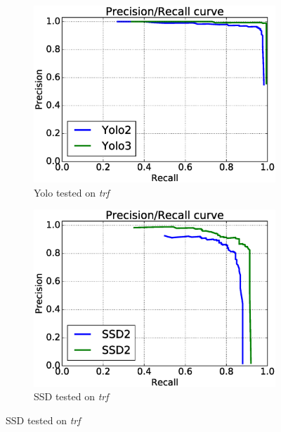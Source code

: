 \begin{figure}[h!]
\begin{subfigure}{.5\textwidth}
  \centering
  \includegraphics[width=0.8\linewidth]{results/case_buildings/prec_recall/yolo/trf.eps}
  \caption{Yolo tested on \textit{trf}}
  \label{fig:sfig1}
\end{subfigure}%
\begin{subfigure}{.5\textwidth}
  \centering
  \includegraphics[width=.8\linewidth]{results/case_buildings/prec_recall/ssd/trf.eps}
  \caption{SSD tested on \textit{trf}}
  \label{fig:sfig2}
\end{subfigure}


\end{figure}
